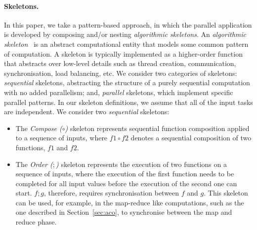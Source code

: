 \documentclass[smallextended]{svjour3}
\begin{document}
\paragraph{Skeletons.} In this paper, we take a pattern-based approach, in which the parallel application is developed
by composing and/or nesting \emph{algorithmic skeletons}. An \emph{algorithmic skeleton}~\cite{cole-th} is an abstract
computational entity that models some common pattern of computation. %
A skeleton is typically implemented as a higher-order function that abstracts over low-level details such as 
thread creation, communication, synchronisation, load balancing, etc.
We consider two categories of skeletons: \emph{sequential} skeletons, abstracting
the structure of a purely sequential computation with no added parallelism; and, \emph{parallel}
skeletons, which implement specific parallel patterns. In our skeleton definitions, we assume
that all of the input tasks are independent.
We consider two \emph{sequential} skeletons:
\begin{itemize}
\item The \emph{Compose ($\circ$)} skeleton represents sequential
  function composition applied to a sequence of inputs, where
$f1 \circ f2$ denotes a sequential composition of two functions, $f1$ and $f2$.
\item The \emph{Order ($;$)} skeleton represents the execution of two
 functions on a sequence of inputs, where the execution of the first function needs to be
 completed for all input values before the execution of the second one
 can start. $f ; g$, therefore, requires synchronisation
 between $f$ and $g$. This skeleton can be used, for example, in the
 map-reduce like computations, such as the one described in
 Section~\ref{sec:aco}, to synchronise between the map and reduce phase.
\end{itemize}
\end{document}
